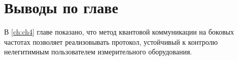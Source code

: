 \pagebreak

\section{Выводы по главе} \label{ch:ch4/sec9}


В \ref{ch:ch4} главе показано, что метод квантовой коммуникации на боковых частотах позволяет реализовывать протокол, устойчивый к контролю нелегитимным пользователем измерительного оборудования. 
 
\pagebreak

